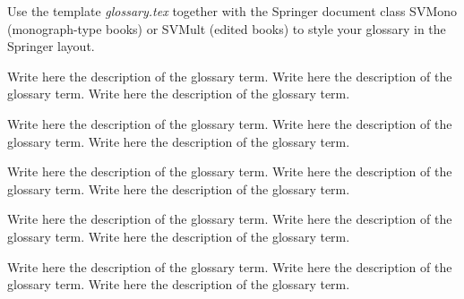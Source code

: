 %
%



Use the template \emph{glossary.tex} together with the Springer document class SVMono (monograph-type books) or SVMult (edited books) to style your glossary in the Springer layout.


 Write here the description of the glossary term. Write here the description of the glossary term. Write here the description of the glossary term.

 Write here the description of the glossary term. Write here the description of the glossary term. Write here the description of the glossary term.

 Write here the description of the glossary term. Write here the description of the glossary term. Write here the description of the glossary term.

 Write here the description of the glossary term. Write here the description of the glossary term. Write here the description of the glossary term.

 Write here the description of the glossary term. Write here the description of the glossary term. Write here the description of the glossary term.